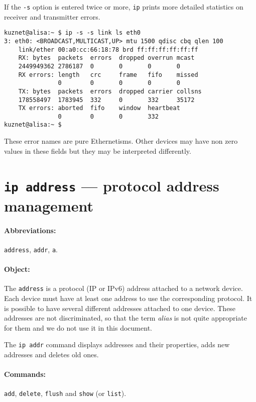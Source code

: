 If the \verb|-s| option is entered twice or more,
\verb|ip| prints more detailed statistics on receiver
and transmitter errors.

\begin{verbatim}
kuznet@alisa:~ $ ip -s -s link ls eth0
3: eth0: <BROADCAST,MULTICAST,UP> mtu 1500 qdisc cbq qlen 100
    link/ether 00:a0:cc:66:18:78 brd ff:ff:ff:ff:ff:ff
    RX: bytes  packets  errors  dropped overrun mcast   
    2449949362 2786187  0       0       0       0      
    RX errors: length   crc     frame   fifo    missed
               0        0       0       0       0      
    TX: bytes  packets  errors  dropped carrier collsns 
    178558497  1783945  332     0       332     35172  
    TX errors: aborted  fifo    window  heartbeat
               0        0       0       332    
kuznet@alisa:~ $
\end{verbatim}
These error names are pure Ethernetisms. Other devices
may have non zero values in these fields but they may be
interpreted differently.


\section{{\tt ip address} --- protocol address management}

\paragraph{Abbreviations:} \verb|address|, \verb|addr|, \verb|a|.

\paragraph{Object:} The \verb|address| is a protocol (IP or IPv6) address attached
to a network device. Each device must have at least one address
to use the corresponding protocol. It is possible to have several
different addresses attached to one device. These addresses are not
discriminated, so that the term {\em alias\/} is not quite appropriate
for them and we do not use it in this document.

The \verb|ip addr| command displays addresses and their properties,
adds new addresses and deletes old ones.

\paragraph{Commands:} \verb|add|, \verb|delete|, \verb|flush| and \verb|show|
(or \verb|list|).


